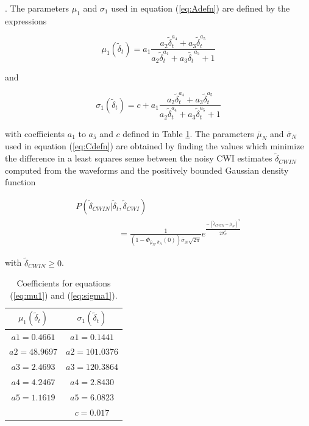 \documentclass[12pt,double]{article}
\begin{document}
\citep{dr_Robinson11a}. The parameters $\mu_1$ and $\sigma_1$ used
in equation (\ref{eq:Adefn}) are defined by the expressions
\begin{linenomath*} \begin{equation}
\label{eq:mu1}
\mu_1(\widetilde{\delta}_t) = a_1\frac{a_2 \widetilde{\delta}_t^{a_4}+a_3
\widetilde{\delta}_t^{a_5}}{a_2 \widetilde{\delta}_t^{a_4}+a_3 \widetilde{\delta_t}^{a_5}+1}
\end{equation} \end{linenomath*}
and
\begin{linenomath*} \begin{equation}
\label{eq:sigma1}
\sigma_1(\widetilde{\delta}_t) = c + a_1\frac{a_2 \widetilde{\delta}_t^{a_4}+
a_3 \widetilde{\delta}_t^{a_5}}{a_2 \widetilde{\delta}_t^{a_4}+a_3 \widetilde{\delta}_t^{a_5}+1}
\end{equation} \end{linenomath*}
with coefficients $a_1$ to $a_5$ and $c$ defined in Table
\ref{tab-const4-mu1-sigma1}. The parameters $\bar{\mu}_N$ and
$\bar{\sigma}_N$ used in equation (\ref{eq:Cdefn}) are obtained by
finding the values which minimize the difference in a least squares
sense between the noisy CWI estimates $\widetilde{\delta}_{CWIN}$
computed from the waveforms and the positively bounded Gaussian
density function
\begin{linenomath*} \begin{equation}
\label{eq-likelihood-noisydata-pdf-orig}
\begin{array}{l}
P(\widetilde{\delta}_{CWIN}|\widetilde{\delta}_t,\widetilde{\delta}_{CWI}) \\
\hspace{5em} = \frac{1}{\left(1-\Phi_{\bar{\mu}_N,\bar{\sigma}_N}(0)\right)\bar{\sigma}_N\sqrt{2\pi}}
e^{  \frac{-(\widetilde{\delta}_{CWIN}-\bar{\mu}_N)^2}{2\bar{\sigma}_N^2}  }
\end{array}
\end{equation} \end{linenomath*}
with $\widetilde{\delta}_{CWIN} \geq 0$.


\begin{table}
\caption{Coefficients for equations (\ref{eq:mu1}) and
(\ref{eq:sigma1}).} \label{tab-const4-mu1-sigma1}
\begin{tabular}{|c|c|}
\hline
$\mu_1(\widetilde{\delta}_t)$ & $\sigma_1(\widetilde{\delta}_t)$ \\
\hline
$a1 = 0.4661$ & $a1 = 0.1441$\\
$a2 = 48.9697$ & $a2 = 101.0376$\\
$a3 = 2.4693$ & $a3 = 120.3864$\\
$a4 = 4.2467$ & $a4 = 2.8430$\\
$a5 = 1.1619$ & $a5 = 6.0823$ \\
     & $c = 0.017$ \\
\hline
\end{tabular}
\end{table}
\end{document}
